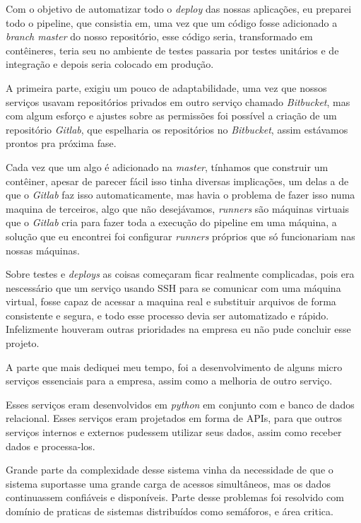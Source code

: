 \documentclass{ufscar}
\begin{document}
Com o objetivo de automatizar todo o \textit{deploy} das nossas aplicações, eu preparei todo o pipeline, que consistia em, uma vez que um código fosse adicionado a \textit{branch master} do nosso repositório, esse código seria, transformado em contêineres, teria seu  no ambiente de testes passaria por testes unitários e de integração e depois seria colocado em produção.

A primeira parte, exigiu um pouco de adaptabilidade, uma vez que nossos serviços usavam repositórios privados em outro serviço chamado \textit{Bitbucket}, mas com algum esforço e ajustes sobre as permissões foi possível a criação de um repositório \textit{Gitlab}, que espelharia os repositórios no \textit{Bitbucket}, assim estávamos prontos pra próxima fase.

Cada vez que um algo é adicionado na \textit{master}, tínhamos que construir um contêiner, apesar de parecer fácil isso tinha diversas implicações, um delas a de que o \textit{Gitlab} faz isso automaticamente, mas havia o problema de fazer isso numa maquina de terceiros, algo que não desejávamos, \textit{runners} são máquinas virtuais que o \textit{Gitlab} cria para fazer toda a execução do pipeline em uma máquina, a solução que eu encontrei foi configurar \textit{runners} próprios que só funcionariam nas nossas máquinas.

Sobre testes e \textit{deploys} as coisas começaram ficar realmente complicadas, pois era nescessário que um serviço usando SSH para se comunicar com uma máquina virtual, fosse capaz de acessar a maquina real e substituir arquivos de forma consistente e segura, e todo esse processo devia ser automatizado e rápido. Infelizmente houveram outras prioridades na empresa eu não pude concluir esse projeto.

A parte que mais dediquei meu tempo, foi a desenvolvimento de alguns micro serviços essenciais para a empresa, assim como a melhoria de outro serviço.

Esses serviços eram desenvolvidos em \textit{python} em conjunto com  e banco de dados relacional. Esses serviços eram projetados em forma de APIs, para que outros serviços internos e externos pudessem utilizar seus dados, assim como receber dados e processa-los.

Grande parte da complexidade desse sistema vinha da necessidade de que o sistema suportasse uma grande carga de acessos simultâneos, mas os dados continuassem confiáveis e disponíveis. Parte desse problemas foi resolvido com domínio de praticas de sistemas distribuídos como semáforos, e área critica.
\end{document}
